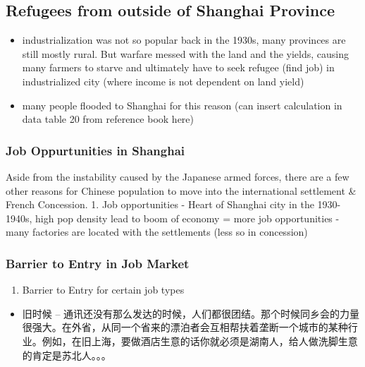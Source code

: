 \documentclass[
  letterpaper,
  DIV=11,
  numbers=noendperiod]{scrartcl}
\providecommand{\tightlist}{%
  \setlength{\itemsep}{0pt}\setlength{\parskip}{0pt}}\usepackage{longtable,booktabs,array}
\begin{document}
\hypertarget{refugees-from-outside-of-shanghai-province}{%
\subsection{Refugees from outside of Shanghai
Province}\label{refugees-from-outside-of-shanghai-province}}

\begin{itemize}
\tightlist
\item
  industrialization was not so popular back in the 1930s, many provinces
  are still mostly rural. But warfare messed with the land and the
  yields, causing many farmers to starve and ultimately have to seek
  refugee (find job) in industrialized city (where income is not
  dependent on land yield)
\item
  many people flooded to Shanghai for this reason (can insert
  calculation in data table 20 from reference book here)
\end{itemize}

\hypertarget{job-oppurtunities-in-shanghai}{%
\subsubsection{Job Oppurtunities in
Shanghai}\label{job-oppurtunities-in-shanghai}}

Aside from the instability caused by the Japanese armed forces, there
are a few other reasons for Chinese population to move into the
international settlement \& French Concession. 1. Job opportunities -
Heart of Shanghai city in the 1930-1940s, high pop density lead to boom
of economy = more job opportunities - many factories are located with
the settlements (less so in concession)

\hypertarget{barrier-to-entry-in-job-market}{%
\subsubsection{Barrier to Entry in Job
Market}\label{barrier-to-entry-in-job-market}}

\begin{enumerate}
\def\labelenumi{\arabic{enumi}.}
\setcounter{enumi}{1}
\tightlist
\item
  Barrier to Entry for certain job types
\end{enumerate}

\begin{itemize}
\tightlist
\item
  旧时候 --
  通讯还没有那么发达的时候，人们都很团结。那个时候同乡会的力量很强大。在外省，从同一个省来的漂泊者会互相帮扶着垄断一个城市的某种行业。例如，在旧上海，要做酒店生意的话你就必须是湖南人，给人做洗脚生意的肯定是苏北人。。。
\end{itemize}
\end{document}
